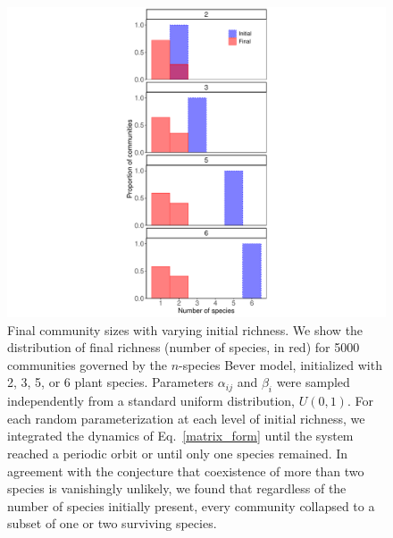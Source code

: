 \documentclass[11pt]{article}
\begin{document}
\begin{figure}
	\centering
	\includegraphics[width=\textwidth]{figure_2.pdf}
	\caption[Final community sizes with varying initial richness]
	{Final community sizes with varying initial richness. We show the distribution of final richness (number of species, in red) for 5000 communities governed by the $n$-species Bever model, initialized with 2, 3, 5, or 6 plant species. Parameters $\alpha_{ij}$ and $\beta_{i}$ were sampled independently from a standard uniform distribution, $U(0,1)$. For each random parameterization at each level of initial richness, we integrated the dynamics of Eq.~\ref{matrix_form} until the system reached a periodic orbit or until only one species remained. In agreement with the conjecture that coexistence of more than two species is vanishingly unlikely, we found that regardless of the number of species initially present, every community collapsed to a subset of one or two surviving species.}
	\label{fig:histograms}
\end{figure}
\end{document}
